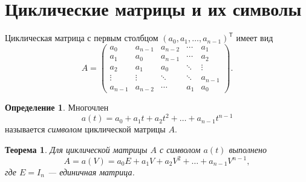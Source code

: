 \documentclass[12pt,a4paper]{article}
\newtheorem{theorem}{Теорема}
\theoremstyle{definition}
\newtheorem{definition}{Определение}
\theoremstyle{remark}
\begin{document}
\section{Циклические матрицы и их символы}

Циклическая матрица с первым столбцом $(a_0,a_1,\dots,a_{n-1})^{\mathsf T}$
имеет вид
\[
  A=
  \begin{pmatrix}
    a_0     & a_{n-1} & a_{n-2} & \cdots & a_1\\
    a_1     & a_0     & a_{n-1} & \cdots & a_2\\
    a_2     & a_1     & a_0     & \ddots & \vdots\\
    \vdots  & \vdots  & \ddots  & \ddots & a_{n-1}\\
    a_{n-1} & a_{n-2} & \cdots  & a_1    & a_0
  \end{pmatrix}.
\]

\begin{definition}
Многочлен
\[
  a(t)=a_0+a_1t+a_2t^2+\dots+a_{n-1}t^{n-1}
\]
называется \emph{символом} циклической матрицы $A$.
\end{definition}

\begin{theorem}
Для циклической матрицы $A$ с символом $a(t)$ выполнено
\[
  A=a(V)=a_0E+a_1V+a_2V^2+\dots+a_{n-1}V^{n-1},
\]
где $E=I_n$ --- единичная матрица.
\end{theorem}
\end{document}

